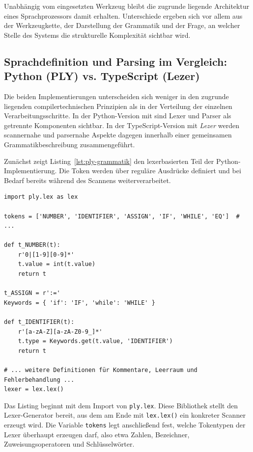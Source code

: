 Unabhängig vom eingesetzten Werkzeug bleibt die zugrunde liegende Architektur eines Sprachprozessors damit erhalten. Unterschiede ergeben sich vor allem aus der Werkzeugkette, der Darstellung der Grammatik und der Frage, an welcher Stelle des Systems die strukturelle Komplexität sichtbar wird.

\subsection{Sprachdefinition und Parsing im Vergleich: Python (PLY) vs. TypeScript (Lezer)}

Die beiden Implementierungen unterscheiden sich weniger in den zugrunde liegenden compilertechnischen Prinzipien als in der Verteilung der einzelnen Verarbeitungsschritte. In der Python-Version mit \emph{} sind Lexer und Parser als getrennte Komponenten sichtbar. In der TypeScript-Version mit \emph{Lezer} werden scannernahe und parsernahe Aspekte dagegen innerhalb einer gemeinsamen Grammatikbeschreibung zusammengeführt.

Zunächst zeigt Listing~\ref{lst:ply-grammatik} den lexerbasierten Teil der Python-Implementierung. Die Token werden über reguläre Ausdrücke definiert und bei Bedarf bereits während des Scannens weiterverarbeitet.

\begin{listing}[htbp]
\caption{Auszug der PLY-Scannerdefinition (Python)}
\label{lst:ply-grammatik}
\begin{verbatim}
import ply.lex as lex

tokens = ['NUMBER', 'IDENTIFIER', 'ASSIGN', 'IF', 'WHILE', 'EQ']  # ...

def t_NUMBER(t):
    r'0|[1-9][0-9]*'
    t.value = int(t.value)
    return t

t_ASSIGN = r':='
Keywords = { 'if': 'IF', 'while': 'WHILE' }

def t_IDENTIFIER(t):
    r'[a-zA-Z][a-zA-Z0-9_]*'
    t.type = Keywords.get(t.value, 'IDENTIFIER')
    return t

# ... weitere Definitionen für Kommentare, Leerraum und Fehlerbehandlung ...
lexer = lex.lex()
\end{verbatim}
\end{listing}

Das Listing beginnt mit dem Import von \texttt{ply.lex}. Diese Bibliothek stellt den Lexer-Generator bereit, aus dem am Ende mit \texttt{lex.lex()} ein konkreter Scanner erzeugt wird. Die Variable \texttt{tokens} legt anschließend fest, welche Tokentypen der Lexer überhaupt erzeugen darf, also etwa Zahlen, Bezeichner, Zuweisungsoperatoren und Schlüsselwörter.

